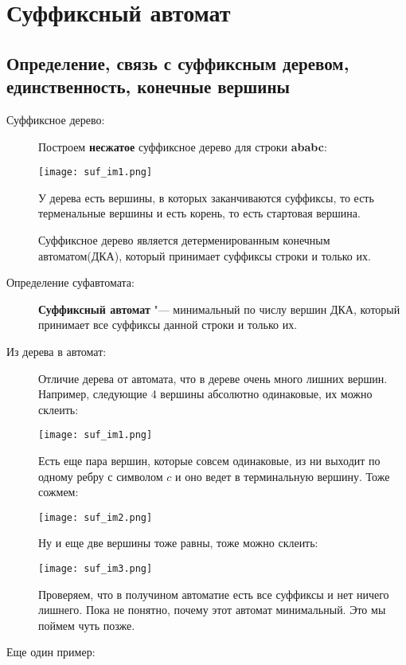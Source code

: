 ﻿\date{September 15, 2016}
\author{Chernikova Olga}

\chapter{Суффиксный автомат}
\section{Определение, связь с суффиксным деревом, единственность, конечные вершины}
\begin{description}
    \item[Суффиксное дерево:]
    Построем \textbf{несжатое} суффиксное дерево для строки \textbf{ababc}:
    
    \texttt{[image: suf\_im1.png]}
    
    У дерева есть вершины, в которых заканчиваются суффиксы, то есть
    терменальные вершины и есть корень, то есть стартовая вершина. 

    \begin{Rem}
    Суффиксное дерево является детерменированным конечным автоматом(ДКА), 
    который принимает суффиксы строки и только их. 
    \end{Rem}

    \item[Определение суфавтомата:]
    \begin{Def}
    \textbf{Суффиксный автомат} "--- минимальный по числу вершин ДКА, 
    который принимает все суффиксы данной строки и только их.
    \end{Def}

    \item[Из дерева в автомат:]
    Отличие дерева от автомата, что в дереве очень много лишних вершин. 
    Например, следующие 4 вершины абсолютно одинаковые, их можно склеить:
   
    \texttt{[image: suf\_im1.png]}

    Есть еще пара вершин, которые совсем одинаковые, из ни выходит по одному ребру 
    с символом $c$ и оно ведет в терминальную вершину. Тоже сожмем:
    
    \texttt{[image: suf\_im2.png]}

    Ну и еще две вершины тоже равны, тоже можно склеить:

    \texttt{[image: suf\_im3.png]}

    Проверяем, что в получином автоматие есть все суффиксы и нет ничего лишнего. 
    Пока не понятно, почему этот автомат минимальный.  Это мы поймем чуть позже.
    \item[Еще один пример:]
    

\end{description}
